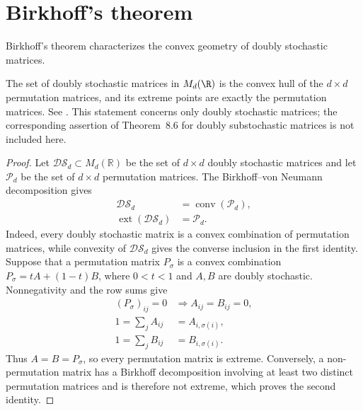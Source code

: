 
\section{Birkhoff's theorem}

Birkhoff's theorem characterizes the convex geometry of doubly
stochastic matrices.

\begin{theorem}
    \label{thm:birkhoff_doubly_stochastic}
    \leanok
    The set of doubly stochastic matrices in $M_d(\R)$ is the convex
    hull of the $d\times d$ permutation matrices, and its extreme
    points are exactly the permutation matrices.
    See \cite[Chapter~8, Theorem~8.6]{Wolf2012Quantum}.
    This statement concerns only doubly stochastic matrices; the
    corresponding assertion of Theorem~8.6 for doubly substochastic
    matrices is not included here.
\end{theorem}

\begin{proof}\leanok
    Let $\mathcal{DS}_d \subset M_d(\mathbb{R})$ be the set of $d \times d$
    doubly stochastic matrices and let $\mathcal{P}_d$ be the set of
    $d \times d$ permutation matrices.  The Birkhoff--von Neumann
    decomposition gives
    \begin{align}
      \mathcal{DS}_d &= \operatorname{conv}(\mathcal{P}_d), \\
      \operatorname{ext}(\mathcal{DS}_d) &= \mathcal{P}_d .
    \end{align}
    Indeed, every doubly stochastic matrix is a convex combination of
    permutation matrices, while convexity of $\mathcal{DS}_d$ gives the
    converse inclusion in the first identity.  Suppose that a permutation
    matrix $P_\sigma$ is a convex combination
    $P_\sigma=tA+(1-t)B$, where $0<t<1$ and $A,B$ are doubly stochastic.
    Nonnegativity and the row sums give
    \begin{align}
      (P_\sigma)_{ij}=0
      &\Longrightarrow A_{ij}=B_{ij}=0, \\
      1=\sum_j A_{ij} &= A_{i,\sigma(i)}, \\
      1=\sum_j B_{ij} &= B_{i,\sigma(i)}.
    \end{align}
    Thus $A=B=P_\sigma$, so every permutation matrix is extreme.
    Conversely, a non-permutation matrix has a Birkhoff decomposition
    involving at least two distinct permutation matrices and is therefore
    not extreme, which proves the second identity.
\end{proof}
\endinput
